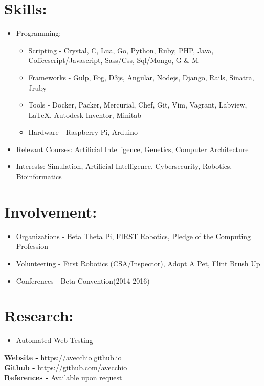 \documentclass{res}
\begin{document}
\section{Skills:}
\begin{itemize}[leftmargin=*]
\item Programming:
\begin{itemize}[label=$\circ$]
\item Scripting - Crystal, C, Lua, Go, Python, Ruby, PHP, Java, Coffeescript/Javascript, Sass/Css, Sql/Mongo, G \& M
\item Frameworks - Gulp, Fog, D3js, Angular, Nodejs, Django, Rails, Sinatra, Jruby
\item Tools - Docker, Packer, Mercurial, Chef, Git, Vim, Vagrant, Labview, \LaTeX, Autodesk Inventor, Minitab
\item Hardware - Raspberry Pi, Arduino
\end{itemize}
\item Relevant Courses: Artificial Intelligence, Genetics, Computer Architecture
\item Interests: Simulation, Artificial Intelligence, Cybersecurity, Robotics, Bioinformatics
\end{itemize}

\section{Involvement:}
\begin{itemize}[leftmargin=*]
\item Organizations - Beta Theta Pi, FIRST Robotics, Pledge of the Computing Profession
\item Volunteering - First Robotics (CSA/Inspector), Adopt A Pet, Flint Brush Up
\item Conferences - Beta Convention(2014-2016)%
\end{itemize}

\section{Research:}
\begin{itemize}[leftmargin=*]
\item Automated Web Testing
\end{itemize}

\begin{center}
\textbf{Website - }https://avecchio.github.io\\
\textbf{Github - }https://github.com/avecchio\\
\textbf{References - }Available upon request
\end{center}
\end{document}
